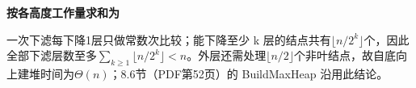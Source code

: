 {\color{ink}\bfseries 按各高度工作量求和为}\par\vspace{1bp}一次下滤每下降1层只做常数次比较；能下降至少 k 层的结点共有\(\lfloor n/\allowbreak{}2^{k}\rfloor \)个，因此全部下滤层数至多\(\sum_{k\ge1}\lfloor n/\allowbreak{}2^{k}\rfloor <\allowbreak{}n\)。外层还需处理\(\lfloor n/\allowbreak{}2\rfloor \)个非叶结点，故自底向上建堆时间为\(\Theta (n)\)；8.6节（PDF第52页）的 BuildMaxHeap 沿用此结论。
